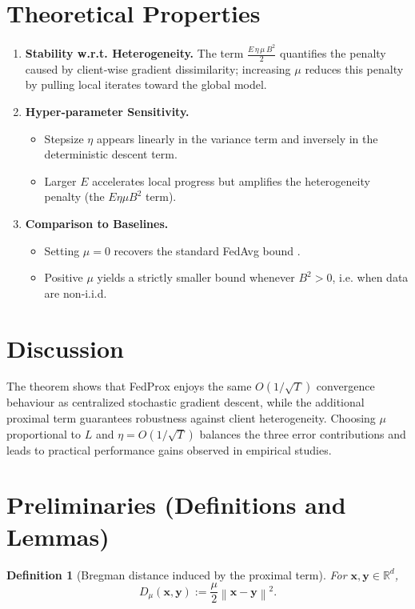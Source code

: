 \documentclass{article}
\newtheorem{definition}{Definition}
\newcommand{\R}{\mathbb{R}}
\newcommand{\norm}[1]{\left\lVert #1\right\rVert}
\begin{document}
\section*{Theoretical Properties}
\begin{enumerate}
    \item \textbf{Stability w.r.t. Heterogeneity.}
          The term $\frac{E\,\eta\,\mu\,B^2}{2}$ quantifies the penalty caused by
          client‑wise gradient dissimilarity; increasing $\mu$ reduces this
          penalty by pulling local iterates toward the global model.
    \item \textbf{Hyper‑parameter Sensitivity.}
          \begin{itemize}
            \item Stepsize $\eta$ appears linearly in the variance term and
                  inversely in the deterministic descent term.
            \item Larger $E$ accelerates local progress but amplifies the
                  heterogeneity penalty (the $E\eta\mu B^2$ term).
          \end{itemize}
    \item \textbf{Comparison to Baselines.}
          \begin{itemize}
            \item Setting $\mu=0$ recovers the standard FedAvg bound
                  \cite{mcmahan2017communication}.
            \item Positive $\mu$ yields a strictly smaller bound whenever
                  $B^2>0$, i.e. when data are non‑i.i.d.
          \end{itemize}
\end{enumerate}

\section*{Discussion}
The theorem shows that FedProx enjoys the same $O(1/\sqrt{T})$ convergence
behaviour as centralized stochastic gradient descent, while the additional
proximal term guarantees robustness against client heterogeneity.
Choosing $\mu$ proportional to $L$ and $\eta=O(1/\sqrt{T})$ balances the three
error contributions and leads to practical performance gains observed in
empirical studies.

\section*{Preliminaries (Definitions and Lemmas)}
\begin{definition}[Bregman distance induced by the proximal term]
For $\bm{x},\bm{y}\in\R^{d}$,
\[
D_{\mu}(\bm{x},\bm{y}) := \frac{\mu}{2}\norm{\bm{x}-\bm{y}}^2 .
\]
\end{definition}
\end{document}
